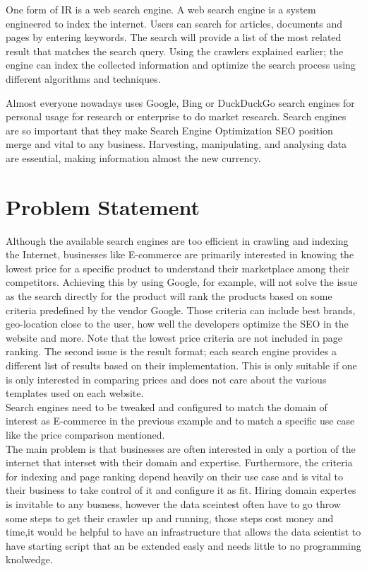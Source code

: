 One form of IR is a web search engine. A web search engine is a system engineered to index the internet. Users can search for articles, documents and pages by entering keywords. The search will provide a list of the most related result that matches the search query. Using the crawlers explained earlier; the engine can index the collected information and optimize the search process using different algorithms and techniques. 

Almost everyone nowadays uses Google, Bing or DuckDuckGo search engines for personal usage for research or enterprise to do market research. Search engines are so important that they make Search Engine Optimization SEO position merge and vital to any business. Harvesting, manipulating, and analysing data are essential, making information almost the new currency. 

\section{Problem Statement}

Although the available search engines are too efficient in crawling and indexing the Internet, businesses like E-commerce are primarily interested in knowing the lowest price for a specific product to understand their marketplace among their competitors. Achieving this by using Google, for example, will not solve the issue as the search directly for the product will rank the products based on some criteria predefined by the vendor Google. Those criteria can include best brands, geo-location close to the user, how well the developers optimize the SEO in the website and more. Note that the lowest price criteria are not included in page ranking. The second issue is the result format; each search engine provides a different list of results based on their implementation. This is only suitable if one is only interested in comparing prices and does not care about the various templates used on each website.\\

Search engines need to be tweaked and configured to match the domain of interest as E-commerce in the previous example and to match a specific use case like the price comparison mentioned.\\

The main problem is that businesses are often interested in only a portion of the internet that interset with their domain and expertise. Furthermore, the criteria for indexing and page ranking depend heavily on their use case and is vital to their business to take control of it and configure it as fit. Hiring domain expertes is invitable to any busness, however the data sceintest often have to go throw some steps to get their crawler up and running, those steps cost money and time,it would be helpful to have an infrastructure that allows the data scientist to have starting script that an be extended easly and needs little to no programming knolwedge. 




